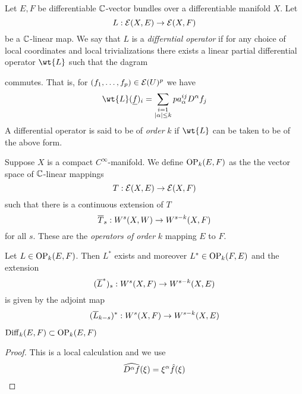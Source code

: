\documentclass[12pt]{article}
\begin{document}
\begin{defn} [1, p. 113]
Let $E, F$ be differentiable $\mathbb{C}$-vector bundles over a differentiable manifold $X$. Let
\[ L : \mathcal{E}(X, E) \to \mathcal{E}(X, F) \]
be a $\mathbb{C}$-linear map. We say that $L$ is a \textit{differntial operator} if for any choice of local coordinates and local trivializations there exists a linear partial differential operator $\wt{L}$ such that the dagram
\begin{center}
\end{center}
commutes. That is, for $(f_1, \dots, f_p) \in \mathcal{E}(U)^p$ we have
\[ \wt{L}(\ul{f})_i = \sum_{\substack{ i = 1 \\ |\alpha| \le k}}p a_\alpha^{ij} D^\alpha f_j \]
A differential operator is said to be of \textit{order} $k$ if $\wt{L}$ can be taken to be of the above form. 
\end{defn}

\begin{defn}
Suppose $X$ is a compact $C^\infty$-manifold. We define $\mathrm{OP}_k(E, F)$ as the the vector space of $\mathbb{C}$-linear mappings
\[ T : \mathcal{E}(X, E) \to \mathcal{E}(X, F) \]
such that there is a continuous extension of $T$
\[ \overline{T}_s : W^s(X, W) \to W^{s-k}(X, F) \]
for all $s$. These are the \textit{operators of order} $k$ mapping $E$ to $F$. 
\end{defn}

\begin{prop} [1, Prop. 2.1]
Let $L \in \mathrm{OP}_k(E, F)$. Then $L^*$ exists and moreover $L^* \in \mathrm{OP}_k(F, E)$ and the extension
\[ (\overline{L}^*)_s : W^s(X, F) \to W^{s-k}(X, E) \]
is given by the adjoint map
\[ (\overline{L}_{k-s})^* : W^s(X, F) \to W^{s-k}(X, E) \]
\end{prop}
 
\begin{prop} [1, Prop. 2.2]
$\mathrm{Diff}_k(E, F) \subset \mathrm{OP}_k(E, F)$
\end{prop}

\begin{proof}
This is a local calculation and we use
\[ \widehat{D^\alpha f}(\xi) = \xi^\alpha \hat{f}(\xi) \]
\end{proof}
\end{document}
